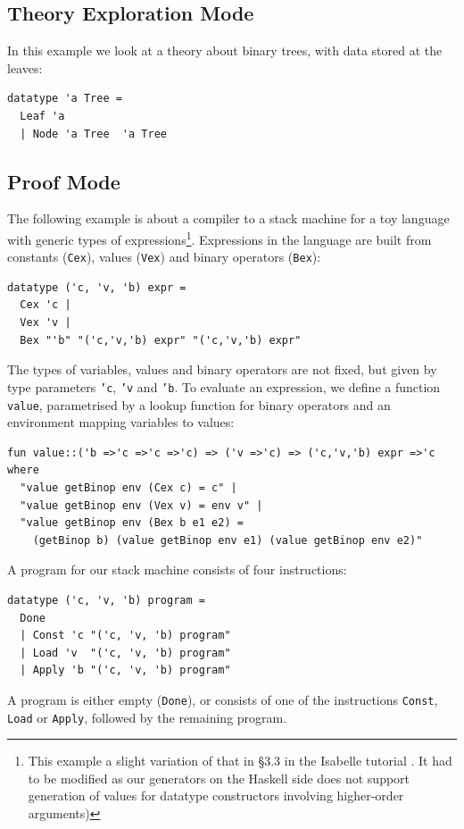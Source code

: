 \subsection{Theory Exploration Mode}
In this example we look at a theory about binary trees, with data stored at the leaves:
\begin{verbatim}
datatype 'a Tree = 
  Leaf 'a 
  | Node 'a Tree  'a Tree
\end{verbatim}

 
\subsection{Proof Mode}
The following example is about a compiler to a stack machine for a toy language with generic types of expressions\footnote{This example a slight variation of that in \S3.3 in the Isabelle tutorial \cite{isabelle}. It had to be modified as our generators on the Haskell side does not support generation of values for datatype constructors involving higher-order arguments)}. Expressions in the language are built from constants (\texttt{Cex}), values (\texttt{Vex}) and binary operators (\texttt{Bex}): 
\begin{verbatim}
datatype ('c, 'v, 'b) expr =
  Cex 'c |
  Vex 'v |
  Bex "'b" "('c,'v,'b) expr" "('c,'v,'b) expr"
\end{verbatim}
The types of variables, values and binary operators are not fixed, but given by type parameters \texttt{'c}, \texttt{'v} and \texttt{'b}. 
To evaluate an expression, we define a function \texttt{value}, parametrised by a lookup function for binary operators and an environment mapping variables to values:
\begin{verbatim}
fun value::('b =>'c =>'c =>'c) => ('v =>'c) => ('c,'v,'b) expr =>'c
where
  "value getBinop env (Cex c) = c" |
  "value getBinop env (Vex v) = env v" |
  "value getBinop env (Bex b e1 e2) = 
    (getBinop b) (value getBinop env e1) (value getBinop env e2)"
\end{verbatim}
A program for our stack machine consists of four instructions:
\begin{verbatim}
datatype ('c, 'v, 'b) program =
  Done
  | Const 'c "('c, 'v, 'b) program"
  | Load 'v  "('c, 'v, 'b) program"
  | Apply 'b "('c, 'v, 'b) program"
\end{verbatim}
A program is either empty (\texttt{Done}), or consists of one of the instructions \texttt{Const}, \texttt{Load} or \texttt{Apply}, followed by the remaining program. 